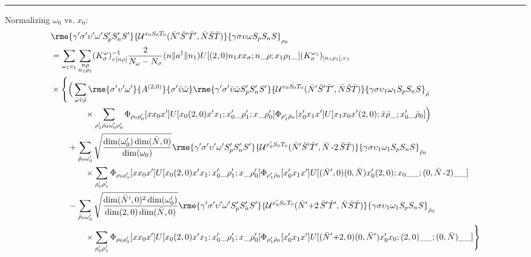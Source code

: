 \documentclass[%
  aps,%
  prc,%
  showpacs,%
  superscriptaddress,%
  onecolumn,%
  notitlepage,%
  11pt,%
  floatfix,%
  amsmath,%
  amssymb,%
]{revtex4-2}
\newcommand{\negative}{\,\text{-}}
\newcommand{\plus}{\text{+}}
\begin{document}
\vspace*{\fill}
\noindent\rule{\textwidth}{1pt}
\vspace*{\fill}

Normalizing $\omega_0$ vs. $x_0$:
\begin{align*}
  &\rme{\gamma'\sigma'\upsilon'\omega'S_p'S_n'S'}{\mathcal{U}^{x_0 S_0 T_0}(\bar{N}'\bar{S}'\bar{T}',\bar{N}\bar{S}\bar{T})}{\gamma\sigma\upsilon\omega S_pS_nS}_{\rho_0}\\
  &=\sum_{\omega_1\upsilon_1} \sum_{\substack{n\rho\\n_1\rho_1}}(K_\sigma^\omega)_{\upsilon[n\rho]}^{-1}\frac{2}{N_\omega - N_\sigma}(n\Vert{}a^\dagger\Vert{}n_1) U[(2,0)n_1 x x_\sigma;n\_\rho;x_1\rho_1\_](K_\sigma^{\omega_1})_{[n_1\rho_1],\upsilon_1}\\
  &\times\Bigg\{\Big(\sum_{\bar{\omega}\bar{\upsilon}\bar{\rho}}
      \rme{\sigma'\upsilon'\omega'}{A^{(2,0)}}{\sigma'\bar{\upsilon}\bar{\omega}}
      \rme{\gamma'\sigma'\bar{\upsilon}\bar{\omega}S_p'S_n'S'}{\mathcal{U}^{x_0S_0T_0}(\bar{N}'\bar{S}'\bar{T}',\bar{N}\bar{S}\bar{T})}{\gamma\sigma\upsilon_1\omega_1S_pS_nS}_{\bar{\rho}}\\
  &\qquad\qquad\times \sum_{\rho_1'\bar{\rho}_0\omega_0'\rho_0'}\Phi_{\rho_0\rho_0'}[x x_0 x'] U[x_0(2,0)x'x_1;x_0'\_\rho_1';x\_\rho_0']\Phi_{\rho_1'\bar{\rho}_0}[x_0' x_1 x'] U[x_1 x_0 x' (2,0);\bar{x}\bar{\rho}\_;x_0'\_\bar{\rho}_0] \Big)\\
  &\qquad+\sum_{\bar{\rho}_0\omega_0'}\sqrt{\frac{\dim(\omega_0')\dim(\bar{N},0)}{\dim(\omega_0)}} \rme{\gamma'\sigma'\upsilon'\omega'S_p'S_n'S'}{\mathcal{U}^{x_0'S_0T_0}(\bar{N}'\bar{S}'\bar{T}',\bar{N}\negative2\,\bar{S}\bar{T})}{\gamma\sigma\upsilon_1\omega_1S_pS_nS}_{\bar{\rho}_0}\\
  &\qquad\qquad\times \sum_{\rho_0'\rho_1'}\Phi_{\rho_0\rho_0'}[x x_0 x'] U[x_0 (2,0)x' x_1;x_0'\_\rho_1';x\_\rho_0']\Phi_{\rho_1'\bar{\rho}_0}[x_0' x_1 x'] U[(\bar{N}',0) (0,\bar{N}) x_0' (2,0);x_0\_\_;(0,\bar{N}\negative2)\_\_]\\
  &\qquad-\sum_{\bar{\rho}_0\omega_0'}\sqrt{\frac{\dim(\bar{N}',0)^2\dim(\omega_0')}{\dim(2,0)\dim(\bar{N},0)}} \rme{\gamma'\sigma'\upsilon'\omega'S_p'S_n'S'}{\mathcal{U}^{x_0' S_0 T_0}(\bar{N}'\plus2\,\bar{S}'\bar{T}',\bar{N}\bar{S}\bar{T})}{\gamma\sigma\upsilon_1\omega_1S_pS_nS}_{\bar{\rho}_0}\\
  &\qquad\qquad\times \sum_{\rho_0'\rho_1'}\Phi_{\rho_0\rho_0'}[x x_0 x'] U[x_0 (2,0) x' x_1;x_0'\_\rho_1';x\_\rho_0']\Phi_{\rho_1'\bar{\rho}_0}[x_0' x_1 x'] U[(\bar{N}'\plus2,0)(0,\bar{N}') x_0' x_0;(2,0)\_\_;(0,\bar{N})\_\_] \Bigg\}
\end{align*}
\clearpage
\end{document}
